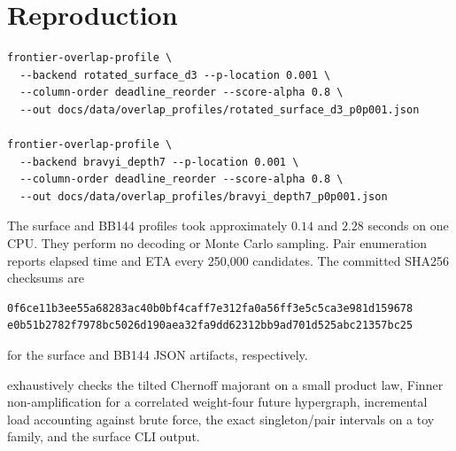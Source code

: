 \documentclass[11pt]{article}
\newcommand{\1}{\mathbf 1}
\begin{document}
\section{Reproduction}

\begin{verbatim}
frontier-overlap-profile \
  --backend rotated_surface_d3 --p-location 0.001 \
  --column-order deadline_reorder --score-alpha 0.8 \
  --out docs/data/overlap_profiles/rotated_surface_d3_p0p001.json

frontier-overlap-profile \
  --backend bravyi_depth7 --p-location 0.001 \
  --column-order deadline_reorder --score-alpha 0.8 \
  --out docs/data/overlap_profiles/bravyi_depth7_p0p001.json
\end{verbatim}
The surface and BB144 profiles took approximately \(0.14\) and \(2.28\)
seconds on one CPU.  They perform no decoding or Monte Carlo sampling.
Pair enumeration reports elapsed time and ETA every 250,000 candidates.
The committed SHA256 checksums are
\begin{verbatim}
0f6ce11b3ee55a68283ac40b0bf4caff7e312fa0a56ff3e5c5ca3e981d159678
e0b51b2782f7978bc5026d190aea32fa9dd62312bb9ad701d525abc21357bc25
\end{verbatim}
for the surface and BB144 JSON artifacts, respectively.

\texttt{} exhaustively
checks the tilted Chernoff majorant on a small product law, Finner
non-amplification for a correlated weight-four future hypergraph,
incremental load accounting against brute force, the exact singleton/pair
intervals on a toy family, and the surface CLI output.
\end{document}
